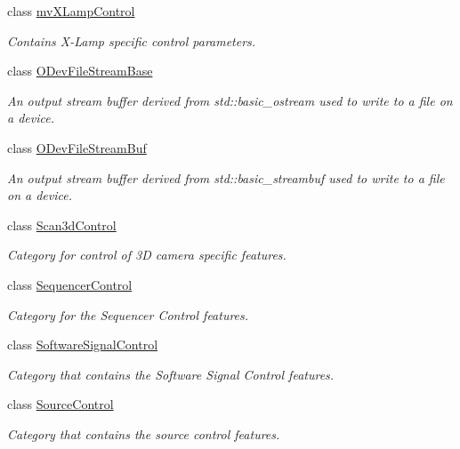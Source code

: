 \begin{DoxyCompactItemize}
class \hyperlink{classmv_i_m_p_a_c_t_1_1acquire_1_1_gen_i_cam_1_1mv_x_lamp_control}{mv\+X\+Lamp\+Control}
\begin{DoxyCompactList}\small\item\em Contains X-\/\+Lamp specific control parameters. \end{DoxyCompactList}\item 
class \hyperlink{classmv_i_m_p_a_c_t_1_1acquire_1_1_gen_i_cam_1_1_o_dev_file_stream_base}{O\+Dev\+File\+Stream\+Base}
\begin{DoxyCompactList}\small\item\em An output stream buffer derived from std\+::basic\+\_\+ostream used to write to a file on a device. \end{DoxyCompactList}\item 
class \hyperlink{classmv_i_m_p_a_c_t_1_1acquire_1_1_gen_i_cam_1_1_o_dev_file_stream_buf}{O\+Dev\+File\+Stream\+Buf}
\begin{DoxyCompactList}\small\item\em An output stream buffer derived from std\+::basic\+\_\+streambuf used to write to a file on a device. \end{DoxyCompactList}\item 
class \hyperlink{classmv_i_m_p_a_c_t_1_1acquire_1_1_gen_i_cam_1_1_scan3d_control}{Scan3d\+Control}
\begin{DoxyCompactList}\small\item\em Category for control of 3\+D camera specific features. \end{DoxyCompactList}\item 
class \hyperlink{classmv_i_m_p_a_c_t_1_1acquire_1_1_gen_i_cam_1_1_sequencer_control}{Sequencer\+Control}
\begin{DoxyCompactList}\small\item\em Category for the Sequencer Control features. \end{DoxyCompactList}\item 
class \hyperlink{classmv_i_m_p_a_c_t_1_1acquire_1_1_gen_i_cam_1_1_software_signal_control}{Software\+Signal\+Control}
\begin{DoxyCompactList}\small\item\em Category that contains the Software Signal Control features. \end{DoxyCompactList}\item 
class \hyperlink{classmv_i_m_p_a_c_t_1_1acquire_1_1_gen_i_cam_1_1_source_control}{Source\+Control}
\begin{DoxyCompactList}\small\item\em Category that contains the source control features. \end{DoxyCompactList}\item 

\end{DoxyCompactItemize}
